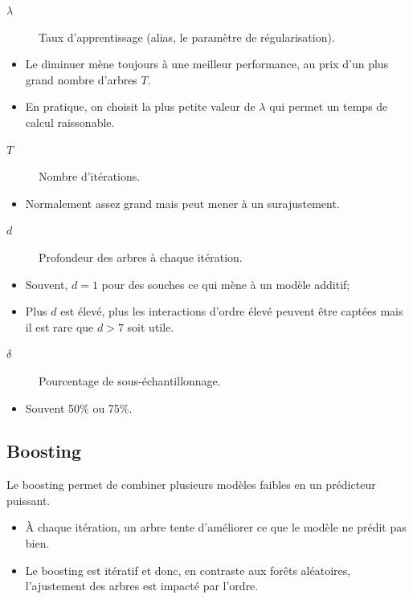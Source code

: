 \documentclass[10pt, french]{article}
\begin{document}
\begin{multicols*}{3}
\begin{distributions}[Terminologie]
\begin{description}
	\item[$\lambda$]	Taux d'apprentissage (alias, le paramètre de régularisation).
\end{description}
		\begin{itemize}[leftmargin = *]
		\item	Le diminuer mène toujours à une meilleur performance, au prix d'un plus grand nombre d'arbres $T$.
		\item	En pratique, on choisit la plus petite valeur de $\lambda$ qui permet un temps de calcul raissonable.
		\end{itemize}
\begin{description}
	\item[$T$]	Nombre d'itérations.
\end{description}
\begin{itemize}[leftmargin = *]
	\item	Normalement assez grand mais peut mener à un surajustement.
\end{itemize}
\begin{description}
	\item[$d$]	Profondeur des arbres à chaque itération.
\end{description}
\begin{itemize}[leftmargin = *]
	\item	Souvent, $d = 1$ pour des souches ce qui mène à un modèle additif;
	\item	Plus $d$ est élevé, plus les interactions d'ordre élevé peuvent être captées mais il est rare que $d > 7$ soit utile.
\end{itemize}
\begin{description}
	\item[$\delta$]	Pourcentage de sous-échantillonnage.
\end{description}
\begin{itemize}[leftmargin = *]
	\item	Souvent 50\% ou 75\%.
\end{itemize}
\end{distributions}

\subsection*{Boosting}
Le boosting permet de combiner plusieurs modèles faibles en un prédicteur puissant.
\begin{itemize}[leftmargin = *]
	\item	À chaque itération, un arbre tente d'améliorer ce que le modèle ne prédit pas bien.
	\item	Le boosting est itératif et donc, en contraste aux forêts aléatoires, l'ajustement des arbres est impacté par l'ordre.
\end{itemize}


\end{multicols*}
\end{document}
